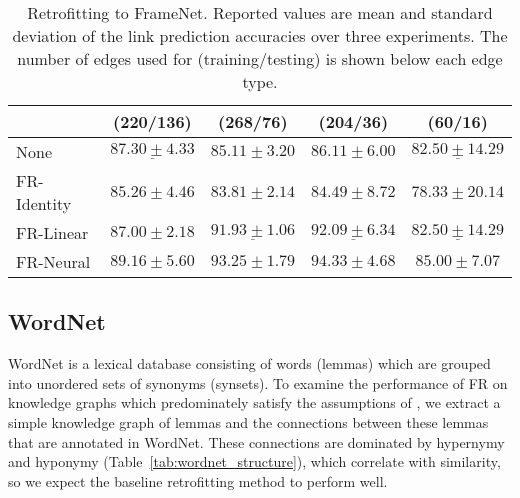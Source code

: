 \documentclass[11pt, a4paper]{article}
\begin{document}
\begin{table*}[htp]
\begin{adjustbox}{center}
\begin{tabular}{l c c c c}
                            & (220/136)          &  (268/76)       & (204/36)             & (60/16)                     \\
        \midrule
        None                & $\underline{87.30\pm4.33}$       & $85.11\pm3.20$      & $86.11\pm6.00$             & $\underline{82.50\pm14.29}$                          \\
        FR-Identity            & $85.26\pm4.46$       & $83.81\pm2.14$               & $84.49\pm8.72$             & $78.33\pm20.14$                          \\
        FR-Linear              & $87.00\pm2.18$ & $\underline{91.93\pm1.06}$   & $\underline{92.09\pm6.34}$   & $\underline{82.50\pm14.29}$             \\
        FR-Neural              & $\boldsymbol{89.16\pm5.60}$  & $\boldsymbol{93.25\pm1.79}$    & $\boldsymbol{94.33\pm4.68}$        & $\boldsymbol{85.00\pm7.07}$                 
    \\
    \bottomrule
    \end{tabular}
    \end{adjustbox}
    \caption{Retrofitting to FrameNet. Reported values are mean and standard deviation of the link prediction accuracies over three experiments. The number of edges used for (training/testing) is shown below each edge type.
    }
    \label{tab:framenet}
\end{table*}

\subsection{WordNet}
\label{sec:wordnet_description}
WordNet \cite{miller1995wordnet,fellbaum_2005} is a lexical database consisting of words (lemmas) which are grouped into unordered sets of synonyms (synsets). To examine the performance of FR on knowledge graphs which predominately satisfy the assumptions of , we extract a simple knowledge graph of lemmas and the connections between these lemmas that are annotated in WordNet. These connections are dominated by hypernymy and hyponymy (Table~\ref{tab:wordnet_structure}), which correlate with similarity, so we expect the baseline retrofitting method to perform well.
\end{document}
